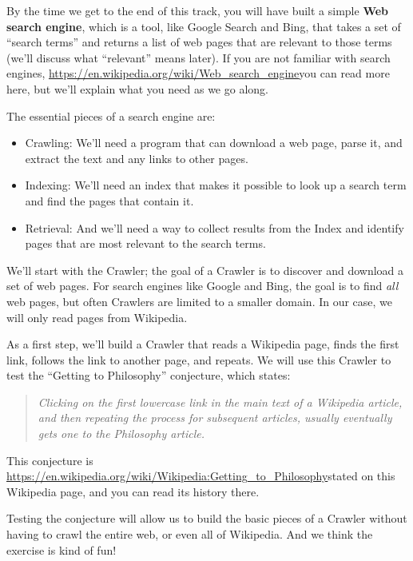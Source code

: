 \documentclass[12pt]{book}
\theoremstyle{exercise}
\begin{document}
By the time we get to the end of this track, you will have built a
simple \textbf{Web search engine}, which is a tool, like Google Search
and Bing, that takes a set of ``search terms'' and returns a list of web
pages that are relevant to those terms (we'll discuss what ``relevant''
means later). If you are not familiar with search engines,
\url{https://en.wikipedia.org/wiki/Web_search_engine}{you can read more
here}, but we'll explain what you need as we go along.

The essential pieces of a search engine are:

\begin{itemize}
\item
  Crawling: We'll need a program that can download a web page, parse it,
  and extract the text and any links to other pages.
\item
  Indexing: We'll need an index that makes it possible to look up a
  search term and find the pages that contain it.
\item
  Retrieval: And we'll need a way to collect results from the Index and
  identify pages that are most relevant to the search terms.
\end{itemize}

We'll start with the Crawler; the goal of a Crawler is to discover and
download a set of web pages. For search engines like Google and Bing,
the goal is to find \emph{all} web pages, but often Crawlers are limited
to a smaller domain. In our case, we will only read pages from
Wikipedia.

As a first step, we'll build a Crawler that reads a Wikipedia page,
finds the first link, follows the link to another page, and repeats. We
will use this Crawler to test the ``Getting to Philosophy'' conjecture,
which states:

\begin{quote}
\emph{Clicking on the first lowercase link in the main text of a
Wikipedia article, and then repeating the process for subsequent
articles, usually eventually gets one to the Philosophy article.}
\end{quote}

This conjecture is
\url{https://en.wikipedia.org/wiki/Wikipedia:Getting_to_Philosophy}{stated
on this Wikipedia page}, and you can read its history there.

Testing the conjecture will allow us to build the basic pieces of a
Crawler without having to crawl the entire web, or even all of
Wikipedia. And we think the exercise is kind of fun!
\end{document}
